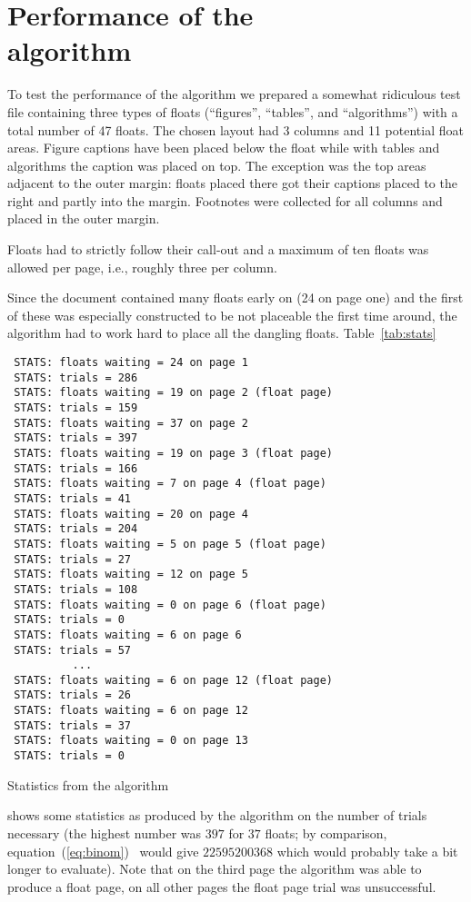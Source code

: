 \documentclass[twocolumn]{article}
\begin{document}
\section[Performance of the algorithm]
        {Performance of the\\algorithm}

To test the performance of the algorithm we prepared a somewhat
ridiculous test file containing three types of floats (``figures'',
``tables'', and ``algorithms'') with a total number of 47 floats. 
The chosen
layout had 3 columns and 11 potential float areas.  Figure captions
have been placed below the float while with tables and algorithms the
caption was placed on top. The exception was the top areas adjacent to
the outer margin: floats placed there got their captions placed to
the right and partly into the margin.  Footnotes were collected for all
columns and placed in the outer margin.

Floats had to strictly follow  their call-out and a maximum of
ten floats was allowed per page, i.e., roughly three per column.

Since the document contained many floats early on (24 on page one) and
the first of these was especially constructed to be not placeable the
first time around, the algorithm had to work hard to place all the
dangling floats. Table~\vref{tab:stats} 
%
\begin{table}
\footnotesize
\begin{minipage}{\columnwidth}
\begin{verbatim}
 STATS: floats waiting = 24 on page 1
 STATS: trials = 286
 STATS: floats waiting = 19 on page 2 (float page)
 STATS: trials = 159
 STATS: floats waiting = 37 on page 2
 STATS: trials = 397
 STATS: floats waiting = 19 on page 3 (float page)
 STATS: trials = 166
 STATS: floats waiting = 7 on page 4 (float page)
 STATS: trials = 41
 STATS: floats waiting = 20 on page 4
 STATS: trials = 204
 STATS: floats waiting = 5 on page 5 (float page)
 STATS: trials = 27
 STATS: floats waiting = 12 on page 5
 STATS: trials = 108
 STATS: floats waiting = 0 on page 6 (float page)
 STATS: trials = 0
 STATS: floats waiting = 6 on page 6
 STATS: trials = 57
          ...
 STATS: floats waiting = 6 on page 12 (float page)
 STATS: trials = 26
 STATS: floats waiting = 6 on page 12
 STATS: trials = 37
 STATS: floats waiting = 0 on page 13
 STATS: trials = 0
\end{verbatim}
\end{minipage}
\caption{Statistics from the algorithm}\label{tab:stats}
\end{table}
%
shows some statistics as produced by the algorithm on the number of
trials necessary (the highest number was $397$ for $37$ floats; by
comparison, equation~(\ref{eq:binom})~ would give
$22595200368$ which would probably take a bit longer to
evaluate). Note that on the third page the algorithm was able to
produce a float page, on all other pages the float page trial was
unsuccessful.
\end{document}
